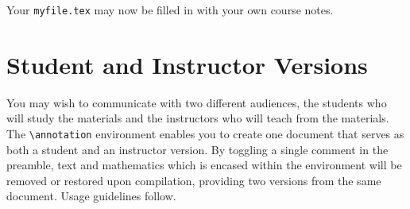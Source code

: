Your \texttt{myfile.tex} may now be filled in with your own course notes.

\section{Student and Instructor Versions}\label{ch:annotation}

You may wish to communicate with two different audiences, the students who
will study the materials and the instructors who will teach from the materials.
The \verb|\annotation| environment enables you to create one document that serves
as both a student and an instructor version.  By toggling a single comment in the preamble,
text and mathematics which is encased within the environment will be removed or restored
upon compilation, providing two versions from the same document.  Usage guidelines follow.

